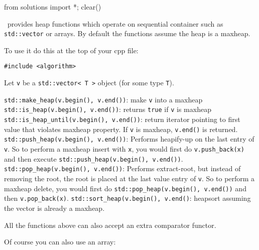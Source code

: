 \begin{python0}
from solutions import *; clear()
\end{python0}

\cpp\ provides heap functions
which operate on sequential container such as \verb!std::vector!
or arrays.
By default the functions assume the heap is a maxheap.

To use it do this at the top of your cpp file:
\begin{Verbatim}[frame=single, fontsize=\small]
#include <algorithm>
\end{Verbatim}

Let \verb!v! be a \verb!std::vector< T >! object (for some type \verb!T!).
\begin{enumerate}[nosep]
  \li \verb!std::make_heap(v.begin(), v.end())!: make \verb!v! into a maxheap
  \li \verb!std::is_heap(v.begin(), v.end())!: returns \verb!true! if \verb!v! is maxheap
  \li \verb!std::is_heap_until(v.begin(), v.end())!:
  return iterator pointing to first value that violates maxheap property.
  If \verb!v! is maxheap, \verb!v.end()! is returned.
  \li \verb!std::push_heap(v.begin(), v.end())!: Performs heapify-up on
  the last entry of \verb!v!.
  So to perform a maxheap insert with \verb!x!, you would first
  do \verb!v.push_back(x)! and then execute
  \verb!std::push_heap(v.begin(), v.end())!.
  \li \verb!std::pop_heap(v.begin(), v.end())!: Performs extract-root,
  but instead of removing the root,
  the root is placed at the last value entry of \verb!v!.
  So to perform a maxheap delete, you would first
  do \verb!std::pop_heap(v.begin(), v.end())!
  and then \verb!v.pop_back(x)!.
  \li \verb!std::sort_heap(v.begin(), v.end()!: heapsort assuming the
  vector is already a maxheap.
\end{enumerate}
All the functions above can also accept an extra comparator functor.

Of course you can also use an array:



